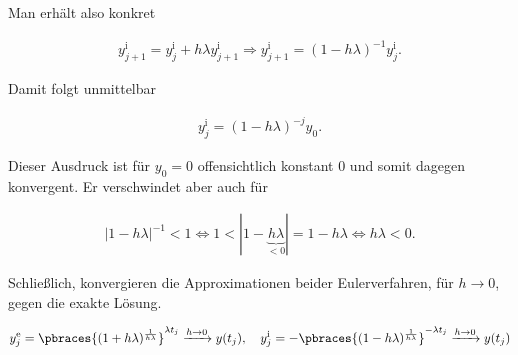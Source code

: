 \begin{solution}
Man erhält also konkret

\begin{align*}
  y_{j+1}^{\mathrm{i}}
  =
  y_j^{\mathrm{i}} + h \lambda y_{j+1}^{\mathrm{i}}
  \Rightarrow
  y_{j+1}^{\mathrm{i}}
  =
  (1 - h \lambda)^{-1} y_j^{\mathrm{i}}.
\end{align*}

Damit folgt unmittelbar

\begin{align*}
  y_j^{\mathrm{i}}
  =
  (1 - h \lambda)^{-j} y_0.
\end{align*}

Dieser Ausdruck ist für $y_0 = 0$ offensichtlich konstant $0$ und somit dagegen konvergent.
Er verschwindet aber auch für

\begin{align*}
  |1 - h \lambda|^{-1} < 1
  \Leftrightarrow
  1 < |1 - \underbrace{h \lambda}_{< 0}| = 1 - h \lambda
  \Leftrightarrow
  h \lambda < 0.
\end{align*}

Schließlich, konvergieren die Approximationen beider Eulerverfahren, für $h \to 0$, gegen die exakte Lösung.

\begin{align*}
  y_j^{\mathrm{e}}
  =
  \pbraces
  {
    (1 + h \lambda)^\frac{1}{h \lambda}
  }^{\lambda t_j}
  \xrightarrow{h \to 0}
  y(t_j),
  \quad
  y_j^{\mathrm{i}}
  =
  -\pbraces
  {
    (1 - h \lambda)^\frac{1}{h \lambda}
  }^{-\lambda t_j}
  \xrightarrow{h \to 0}
  y(t_j)
\end{align*}

\end{solution}
